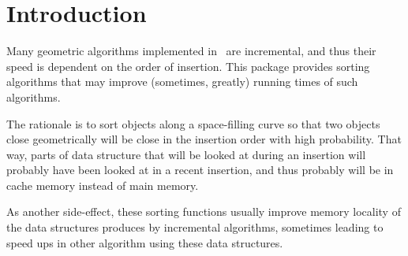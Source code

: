 \section{Introduction}

Many geometric algorithms implemented in \cgal\ are incremental, and thus their
speed is dependent on the order of insertion.  This package provides sorting
algorithms that may improve (sometimes, greatly) running times of such
algorithms.

The rationale is to sort objects along a space-filling curve so that two
objects close geometrically will be close in the insertion order with high
probability.  That way, parts of data structure that will be looked at during
an insertion will probably have been looked at in a recent insertion, and thus
probably will be in cache memory instead of main memory.

As another side-effect, these sorting functions usually improve memory locality
of the data structures produces by incremental algorithms, sometimes leading to
speed ups in other algorithm using these data structures.
